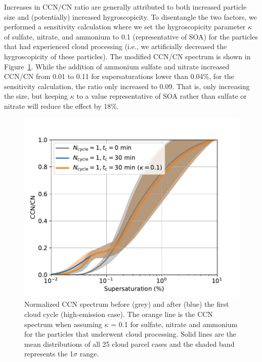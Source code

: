\documentclass[edeposit,fullpage]{uiucthesis2009}
\begin{document}
Increases in CCN/CN ratio are generally attributed to both
  increased particle size and (potentially) increased
  hygroscopicity. To disentangle the two factors, we performed a
  sensitivity calculation where we set the hygroscopicity parameter
  $\kappa$ of sulfate, nitrate, and ammonium to 0.1 (representative of
  SOA) for the particles that had experienced cloud processing (i.e.,
  we artificially decreased the hygroscopicity of these particles). The
  modified CCN/CN spectrum is shown in Figure~\ref{fig:sup-new-kappa}. While the addition
  of ammonium sulfate and nitrate increased CCN/CN from 0.01 to 0.11
  for supersaturations lower than 0.04\%, for the sensitivity
  calculation, the ratio only increased to 0.09. That is, only
  increasing the size, but keeping $\kappa$ to a value representative
  of SOA rather than sulfate or nitrate will reduce the effect by
  18\%.
  
  \begin{figure}
    \centering
    \includegraphics[scale=0.5]{chap3_figs/fig_sup3.pdf}
    \caption{Normalized CCN spectrum before (grey) and after (blue)
      the first cloud cycle (high-emission case). The orange line is
      the CCN spectrum when assuming $\kappa$ = 0.1 for sulfate,
      nitrate and ammonium for the particles that underwent cloud
      processing. Solid lines are the mean distributions of all 25
      cloud parcel cases and the shaded band represents the 1$\sigma$
      range.}
    \label{fig:sup-new-kappa}
\end{figure}
\end{document}
